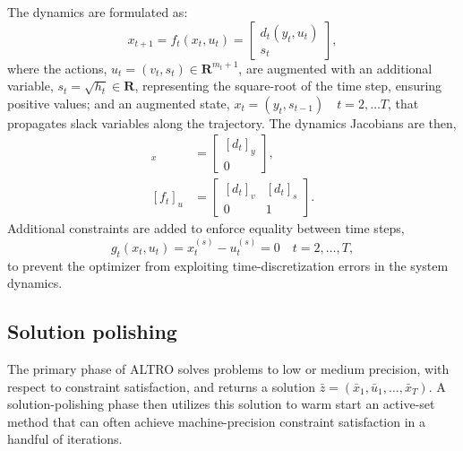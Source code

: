 The dynamics are formulated as: 
\begin{equation}
	x_{t+1} = f_t(x_t, u_t) = \begin{bmatrix} d_t(y_t, u_t) \\ s_t \end{bmatrix} \label{altro_free_time_dynamics},
\end{equation}
where the actions, $u_t = (v_t, s_t) \in \mathbf{R}^{m_t + 1}$, are augmented with an additional variable, $s_t = \sqrt{h_t} \in \mathbf{R}$, representing the square-root of the time step, ensuring positive values; and an augmented state, $x_t = (y_t, s_{t-1}) \quad t = 2, \dots T$, that propagates slack variables along the trajectory. The dynamics Jacobians are then, 
\begin{align}
	[f_t]_x &= \begin{bmatrix} [d_t]_y \\ 0 \end{bmatrix}, \\
	[f_t]_u &= \begin{bmatrix} [d_t]_v & [d_t]_s \\ 0 & 1 \end{bmatrix}.
\end{align}
Additional constraints are added to enforce equality between time steps,
\begin{equation}
	g_t(x_t, u_t) = x_t^{(s)} - u_t^{(s)} = 0 \quad t = 2, \dots, T,
\end{equation}
to prevent the optimizer from exploiting time-discretization errors in the system dynamics.

\subsection{Solution polishing} \label{altro_projected_newton}
The primary phase of ALTRO solves problems to low or medium precision, with respect to constraint satisfaction, and returns a solution $\bar{z} = (\bar{x}_1, \bar{u}_1, \dots, \bar{x}_T)$. A solution-polishing phase then utilizes this solution to warm start an active-set method \cite{nocedal2006numerical} that can often achieve machine-precision constraint satisfaction in a handful of iterations.

